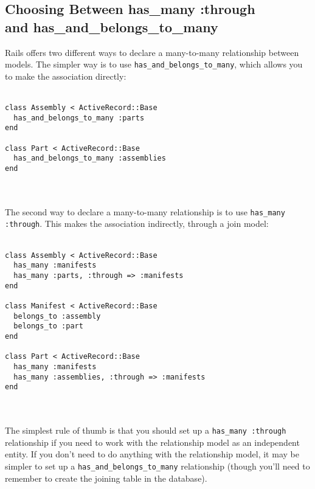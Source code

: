 \documentclass[10pt]{book}
\begin{document}
\subsection{ Choosing Between has\_many :through \\ and has\_and\_belongs\_to\_many}

Rails offers two different ways to declare a many-to-many relationship between models. The simpler way is to use \texttt{has\_and\_belongs\_to\_many}, which allows you to make the association directly:
\\ \\
\begin{minipage}{\textwidth}{\scriptsize
\begin{verbatim}
class Assembly < ActiveRecord::Base
  has_and_belongs_to_many :parts
end
 
class Part < ActiveRecord::Base
  has_and_belongs_to_many :assemblies
end
\end{verbatim}}
\end{minipage}
\\ \\

The second way to declare a many-to-many relationship is to use \texttt{has\_many :through}. This makes the association indirectly, through a join model:
\\ \\
\begin{minipage}{\textwidth}{\scriptsize
\begin{verbatim}
class Assembly < ActiveRecord::Base
  has_many :manifests
  has_many :parts, :through => :manifests
end
 
class Manifest < ActiveRecord::Base
  belongs_to :assembly
  belongs_to :part
end
 
class Part < ActiveRecord::Base
  has_many :manifests
  has_many :assemblies, :through => :manifests
end
\end{verbatim}}
\end{minipage}
\\ \\

The simplest rule of thumb is that you should set up a \texttt{has\_many :through}  relationship if you need to work with the relationship model as an  independent entity. If you don’t need to do anything with the  relationship model, it may be simpler to set up a \texttt{has\_and\_belongs\_to\_many} relationship (though you’ll need to remember to create the joining table in the database).
\end{document}
